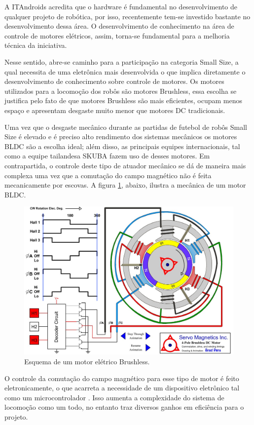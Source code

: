 \documentclass[a4paper,11pt]{article}
\begin{document}
		A ITAndroids acredita que o hardware é fundamental no desenvolvimento de qualquer projeto de robótica, por isso, recentemente tem-se investido bastante no desenvolvimento dessa área. O desenvolvimento de conhecimento na área de controle de motores elétricos, assim, torna-se fundamental para a melhoria técnica da iniciativa.
		
		Nesse sentido, abre-se caminho para a participação na categoria Small Size, a qual necessita de uma eletrônica mais desenvolvida o que implica diretamente o desenvolvimento de conhecimento sobre controle de motores. Os motores utilizados para a locomoção dos robôs são motores Brushless, essa escolha se justifica pelo fato de que motores Brushless são mais eficientes, ocupam menos espaço e apresentam desgaste muito menor que motores DC tradicionais.
		
		Uma vez que o desgaste mecânico durante as partidas de futebol de robôs Small Size é elevado e é preciso alto rendimento dos sistemas mecânicos os motores BLDC são a escolha ideal; além disso, as principais equipes internacionais, tal como a equipe tailandesa SKUBA \cite{skuba} fazem uso de desses motores. Em contrapartida, o controle deste tipo de atuador mecânico se dá de maneira mais complexa uma vez que a comutação do campo magnético não é feita mecanicamente por escovas. A figura \ref{fig:esquemamotor}, abaixo, ilustra a mecânica de um motor BLDC.
		
		\begin{figure}[ht]
			\centering
			\includegraphics[width=0.7\linewidth]{images/4-Pole-brushless-DC-motor-animation}
			\caption{Esquema de um motor elétrico Brushless.}
			\label{fig:esquemamotor}
		\end{figure}
		
		
		O controle da comutação do campo magnético para esse tipo de motor é feito eletronicamente, o que acarreta a necessidade de um dispositivo eletrônico tal como um microcontrolador \cite{introducaobldc}. Isso aumenta a complexidade do sistema de locomoção como um todo, no entanto traz diversos ganhos em eficiência para o projeto.
		
\end{document}
